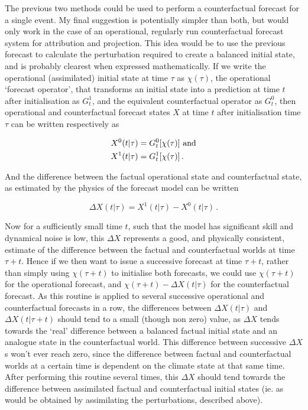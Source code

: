       The previous two methods could be used to perform a counterfactual forecast for a single event. My final suggestion is potentially simpler than both, but would only work in the case of an operational, regularly run counterfactual forecast system for attribution and projection. This idea would be to use the previous forecast to calculate the perturbation required to create a balanced initial state, and is probably clearest when expressed mathematically. If we write the operational (assimilated) initial state at time $\tau$ as $\chi(\tau)$, the operational `forecast operator', that transforms an initial state into a prediction at time $t$ after initialisation as $G_t^1$, and the equivalent counterfactual operator as $G_t^0$, then operational and counterfactual forecast states $X$ at time $t$ after initialisation time $\tau$ can be written respectively as

      \begin{align*}
        X^0(t|\tau) &= G_t^0[\chi(\tau)] \ \textnormal{and}\\
        X^1(t|\tau) &= G_t^1[\chi(\tau)]\,.
      \end{align*}

      \noindent And the difference between the factual operational state and counterfactual state, as estimated by the physics of the forecast model can be written

      \begin{equation}
        \Delta X(t|\tau) = X^1(t|\tau) - X^0(t|\tau)\,.
      \end{equation}

      \noindent Now for a sufficiently small time $t$, such that the model has significant skill and dynamical noise is low, this $\Delta X$ represents a good, and physically consistent, estimate of the difference between the factual and counterfactual worlds at time $\tau + t$. Hence if we then want to issue a successive forecast at time $\tau + t$, rather than simply using $\chi(\tau+t)$ to initialise both forecasts, we could use $\chi(\tau+t)$ for the operational forecast, and $\chi(\tau+t) - \Delta X(t|\tau)$ for the counterfactual forecast. As this routine is applied to several successive operational and counterfactual forecasts in a row, the differences between $\Delta X(t|\tau)$ and $\Delta X(t|\tau+t)$ should tend to a small (though non zero) value, as $\Delta X$ tends towards the `real' difference between a balanced factual initial state and an analogue state in the counterfactual world. This difference between successive $\Delta X$s won't ever reach zero, since the difference between factual and counterfactual worlds at a certain time is dependent on the climate state at that same time. After performing this routine several times, this $\Delta X$ should tend towards the difference between assimilated factual and counterfactual initial states (ie. as would be obtained by assimilating the perturbations, described above).

